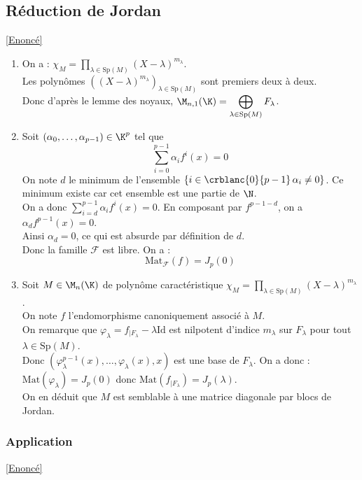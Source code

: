 \documentclass[8pt]{book}
\begin{document}
	\subsection{Réduction de Jordan}
	\label{Réduction de Jordan corrigé}
	\textcolor{blue}{\hyperref[Réduction de Jordan]{[Enoncé]}}\\
	\begin{enumerate}
		\item On a : $\displaystyle\chi_M=\prod_{\lambda\in\text{Sp}(M)}(X-\lambda)^{m_\lambda}$.
		\\Les polynômes $((X-\lambda)^{m_\lambda})_{\lambda\in\text{Sp}(M)}$ sont premiers deux à deux. \\Donc d'après le lemme des noyaux, $\displaystyle\M_{n,1}(\K)=\bigoplus_{\lambda\in\text{Sp}(M)}F_\lambda$.
		\item Soit $(\alpha_0,\dots,\alpha_{p-1})\in\K^p$ tel que $$\sum_{i=0}^{p-1}\alpha_if^i(x)=0$$
		On note $d$ le minimum de l'ensemble $\left\{ i\in\crblanc{0}{p-1} \, \alpha_i\ne0\right\}$. Ce minimum existe car cet ensemble est une partie de $\N$.
		\\ On a donc $\displaystyle\sum_{i=d}^{p-1}\alpha_if^i(x)=0$.
		En composant par $f^{p-1-d}$, on a $\alpha_df^{p-1}(x)=0$. \\Ainsi $\alpha_d=0$, ce qui est absurde par définition de $d$.
		\\Donc la famille $\mathcal{F}$ est libre.
		On a : $$\text{Mat}_\mathcal{F}(f)=J_p(0)$$
		\item Soit $M\in\M_n(\K)$ de polynôme caractéristique $\displaystyle\chi_M=\prod_{\lambda\in\text{Sp}(M)}(X-\lambda)^{m_\lambda}$.
		\\ On note $f$ l'endomorphisme canoniquement associé à $M$.
		\\On remarque que $\varphi_\lambda=f_{|F_\lambda}-\lambda \text{Id}$ est nilpotent d'indice $m_\lambda$ sur $F_\lambda$ pour tout $\lambda\in\text{Sp}(M)$.
		\\ Donc $(\varphi_\lambda^{p-1}(x),\dots,\varphi_\lambda (x),x)$ est une base de $F_\lambda$. On a donc : $\text{Mat}(\varphi_\lambda)=J_p(0)$ donc $\text{Mat}(f_{|F_\lambda})=J_p(\lambda)$.
		\\On en déduit que $M$ est semblable à une matrice diagonale par blocs de Jordan.
	\end{enumerate}
	
	\subsubsection{Application}
	\label{Jordan implique Dunford corrigé}
	\textcolor{blue}{\hyperref[Jordan implique Dunford]{[Enoncé]}}\\
	
\end{document}
